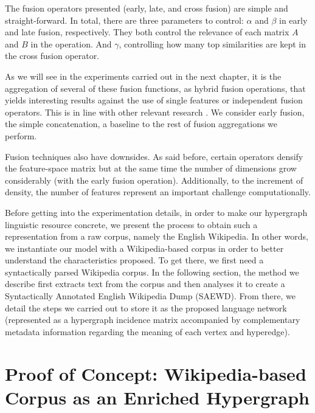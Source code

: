 The fusion operators presented (early, late, and cross fusion) are simple and straight-forward. In total, there are three parameters to control: $\alpha$ and $\beta$ in early and late fusion, respectively. They both control the relevance of each matrix $A$ and $B$ in the operation.  And $\gamma$, controlling how many top similarities are kept in the cross fusion operator.

As we will see in the experiments carried out in the next chapter, it is the aggregation of several of these fusion functions, as hybrid fusion operations, that yields interesting results against the use of single features or independent fusion operators. This is in line with other relevant research \cite{Ah-PineCC15}. We consider early fusion, the simple concatenation, a baseline to the rest of fusion aggregations we perform. 

Fusion techniques also have downsides. As said before, certain  operators densify the feature-space matrix but at the same time the number of dimensions grow considerably (with the early fusion operation). Additionally, to the increment of density, the number of features represent an important challenge computationally. 

Before getting into the experimentation details, in order to make our hypergraph linguistic resource concrete, we present the process to obtain such a representation from a raw corpus, namely the English Wikipedia. In other words, we instantiate our model with a Wikipedia-based corpus in order to better understand the characteristics proposed. To get there, we first need a syntactically parsed Wikipedia corpus. In the following section, the method we describe first extracts text from the corpus and then analyses it to create a Syntactically Annotated English Wikipedia Dump (SAEWD). From there, we detail the steps we carried out to store it as the proposed language network (represented as a hypergraph incidence matrix accompanied by complementary metadata information regarding the meaning of each vertex and hyperedge). 



\section{Proof of Concept: Wikipedia-based Corpus as an Enriched Hypergraph}

